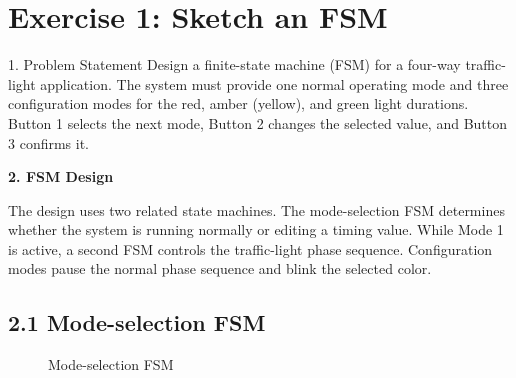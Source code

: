 \section*{Exercise 1: Sketch an FSM}

\begin{questionbox}{1. Problem Statement}
Design a finite-state machine (FSM) for a four-way traffic-light application. The system must provide one normal operating mode and three configuration modes for the red, amber (yellow), and green light durations. Button 1 selects the next mode, Button 2 changes the selected value, and Button 3 confirms it.
\end{questionbox}

\vspace{0.4cm}
\textbf{2. FSM Design}

The design uses two related state machines. The mode-selection FSM determines whether the system is running normally or editing a timing value. While Mode 1 is active, a second FSM controls the traffic-light phase sequence. Configuration modes pause the normal phase sequence and blink the selected color.

\subsection*{2.1 Mode-selection FSM}
\begin{figure}[H]
    \centering
    \caption{Mode-selection FSM}
    \label{fig:exercise1_mode_fsm}
\end{figure}

